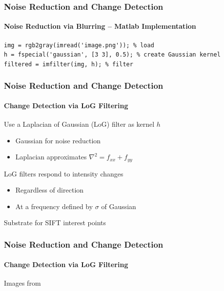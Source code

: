 \documentclass[xetex,professionalfont]{beamer}
\begin{document}

\begin{frame}[fragile]
\frametitle{Noise Reduction and Change Detection}
\framesubtitle{Noise Reduction via Blurring -- Matlab Implementation}

\begin{verbatim}
img = rgb2gray(imread('image.png')); % load
h = fspecial('gaussian', [3 3], 0.5); % create Gaussian kernel
filtered = imfilter(img, h); % filter
\end{verbatim}

\end{frame}


\begin{frame}
\frametitle{Noise Reduction and Change Detection}
\framesubtitle{Change Detection via LoG Filtering}

Use a Laplacian of Gaussian (LoG) filter as kernel $h$ %
\begin{itemize}
	\item Gaussian for noise reduction
	\item Laplacian approximates $\nabla^2=f_{xx}+f_{yy}$ %
\end{itemize}

\bigskip
LoG filters respond to intensity changes %
\begin{itemize}
	\item Regardless of direction
	\item At a frequency defined by $\sigma$ of Gaussian
\end{itemize}

\bigskip
Substrate for SIFT interest points %

\end{frame}


\begin{frame}
\frametitle{Noise Reduction and Change Detection}
\framesubtitle{Change Detection via LoG Filtering}

\begin{center}
	{\centering Images from \cite{prince12}}
\end{center}

\end{frame}
\end{document}
